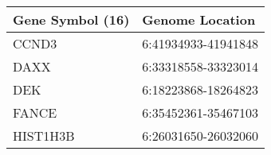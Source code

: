 \begin{tabular}{ll}
\toprule
Gene Symbol (16) &     Genome Location \\
\midrule
           CCND3 & 6:41934933-41941848 \\
            DAXX & 6:33318558-33323014 \\
             DEK & 6:18223868-18264823 \\
           FANCE & 6:35452361-35467103 \\
        HIST1H3B & 6:26031650-26032060 \\
\bottomrule
\end{tabular}
